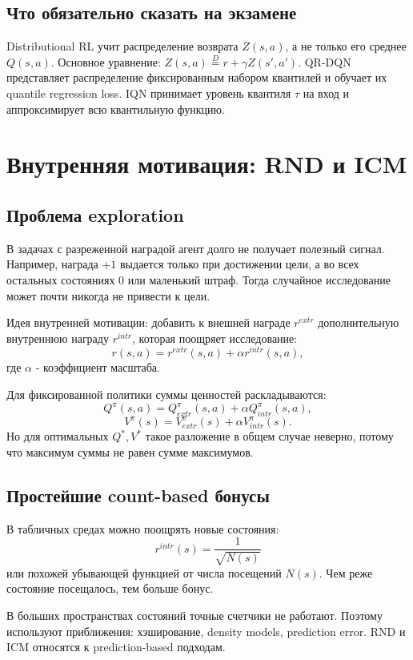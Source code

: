 \documentclass[11pt,a4paper]{article}
\newcommand{\1}{\mathbf{1}}
\begin{document}
\subsection*{Что обязательно сказать на экзамене}
Distributional RL учит распределение возврата $Z(s,a)$, а не только его среднее $Q(s,a)$. Основное уравнение: $Z(s,a)\overset{D}{=}r+\gamma Z(s',a')$. QR-DQN представляет распределение фиксированным набором квантилей и обучает их quantile regression loss. IQN принимает уровень квантиля $\tau$ на вход и аппроксимирует всю квантильную функцию.

\newpage
\section{Внутренняя мотивация: RND и ICM}

\subsection*{Проблема exploration}
В задачах с разреженной наградой агент долго не получает полезный сигнал. Например, награда $+1$ выдается только при достижении цели, а во всех остальных состояниях $0$ или маленький штраф. Тогда случайное исследование может почти никогда не привести к цели.

Идея внутренней мотивации: добавить к внешней награде $r^{extr}$ дополнительную внутреннюю награду $r^{intr}$, которая поощряет исследование:
\[
    r(s,a)=r^{extr}(s,a)+\alpha r^{intr}(s,a),
\]
где $\alpha$ - коэффициент масштаба.

Для фиксированной политики суммы ценностей раскладываются:
\[
    Q^\pi(s,a)=Q^\pi_{extr}(s,a)+\alpha Q^\pi_{intr}(s,a),
\]
\[
    V^\pi(s)=V^\pi_{extr}(s)+\alpha V^\pi_{intr}(s).
\]
Но для оптимальных $Q^*,V^*$ такое разложение в общем случае неверно, потому что максимум суммы не равен сумме максимумов.

\subsection*{Простейшие count-based бонусы}
В табличных средах можно поощрять новые состояния:
\[
    r^{intr}(s)=\frac{1}{\sqrt{N(s)}}
\]
или похожей убывающей функцией от числа посещений $N(s)$. Чем реже состояние посещалось, тем больше бонус.

В больших пространствах состояний точные счетчики не работают. Поэтому используют приближения: хэширование, density models, prediction error. RND и ICM относятся к prediction-based подходам.
\end{document}

